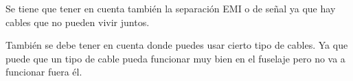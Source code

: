 \documentclass[12pt, letterpaper]{article}
\begin{document}
Se tiene que tener en cuenta también la separación EMI o de señal ya que hay cables que no pueden vivir juntos. 

También se debe tener en cuenta donde puedes usar cierto tipo de cables. Ya que puede que un tipo de cable pueda funcionar muy bien en el fuselaje pero no va a funcionar fuera él.
\renewcommand\refname{Referencias}
\printbibliography
\end{document}
